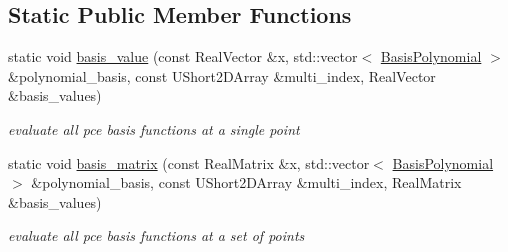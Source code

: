 \subsection*{Static Public Member Functions}
\begin{DoxyCompactItemize}
\item 
static void \hyperlink{classPecos_1_1OrthogPolyApproximation_a737da4973b81df7d2f3f035bde58e4e7}{basis\+\_\+value} (const Real\+Vector \&x, std\+::vector$<$ \hyperlink{classPecos_1_1BasisPolynomial}{Basis\+Polynomial} $>$ \&polynomial\+\_\+basis, const U\+Short2\+D\+Array \&multi\+\_\+index, Real\+Vector \&basis\+\_\+values)\label{classPecos_1_1OrthogPolyApproximation_a737da4973b81df7d2f3f035bde58e4e7}

\begin{DoxyCompactList}\small\item\em evaluate all pce basis functions at a single point \end{DoxyCompactList}\item 
static void \hyperlink{classPecos_1_1OrthogPolyApproximation_a9e7918f42d9c8b52624750ee4882495e}{basis\+\_\+matrix} (const Real\+Matrix \&x, std\+::vector$<$ \hyperlink{classPecos_1_1BasisPolynomial}{Basis\+Polynomial} $>$ \&polynomial\+\_\+basis, const U\+Short2\+D\+Array \&multi\+\_\+index, Real\+Matrix \&basis\+\_\+values)\label{classPecos_1_1OrthogPolyApproximation_a9e7918f42d9c8b52624750ee4882495e}

\begin{DoxyCompactList}\small\item\em evaluate all pce basis functions at a set of points \end{DoxyCompactList}\end{DoxyCompactItemize}
